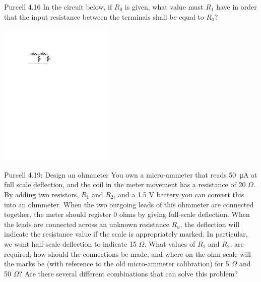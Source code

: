 \documentclass{esg8022pset}
\begin{document}
\begin{problem}{Purcell 4.16}
  In the circuit below, if $R_0$ is given, what value must $R_1$ have in order
  that the input resistance between the terminals shall be equal to $R_0$?
  
  \begin{center}\includegraphics[width=0.4\textwidth]{ps06_05_01.pdf}\end{center}
\end{problem}
\begin{solution}
  
\end{solution}





\begin{problem}{Purcell 4.19: Design an ohmmeter}
  You own a micro-ammeter that reads \SI{50}{\micro\ampere} at full scale deflection, and the coil in the meter movement has a resistance of 20 $\Omega$. By adding two resistors, $R_1$ and $R_2$, and a 1.5 V battery you can convert this into an ohmmeter. When the two outgoing leads of this ohmmeter are connected together, the meter should register 0 ohms by giving full-scale deflection. When the leads are connected across an unknown resistance $R_u$, the deflection will indicate the resistance value if the scale is appropriately marked. In particular, we want half-scale deflection to indicate 15 $\Omega$. What values of $R_1$ and $R_2$, are required, how should the connections be made, and where on the ohm scale will the marks be (with reference to the old micro-ammeter calibration) for 5 $\Omega$ and 50 $\Omega$? Are there several different combinations that can solve this problem?
\end{problem}
\begin{solution}

\end{solution}
\end{document}
